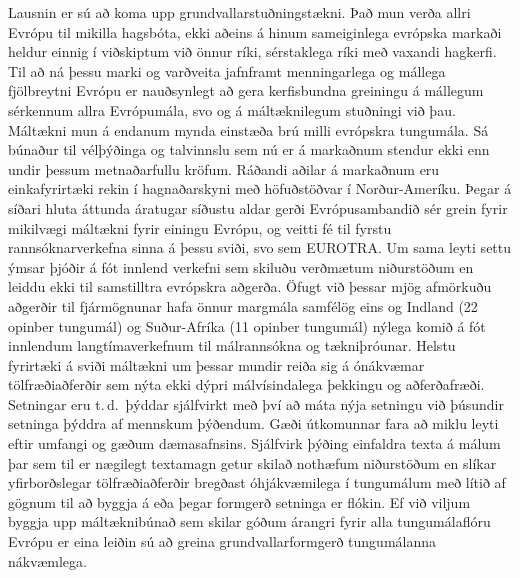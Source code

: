 \begin{multicols}{2}
Lausnin er sú að koma upp grundvallarstuðningstækni. Það mun verða allri Evrópu til mikilla hagsbóta, ekki aðeins á hinum sameiginlega evrópska markaði heldur einnig í viðskiptum við önnur ríki, sérstaklega ríki með vaxandi hagkerfi. Til að ná þessu marki og varðveita jafnframt menningarlega og mállega fjölbreytni Evrópu er nauðsynlegt að gera kerfisbundna greiningu á mállegum sérkennum allra Evrópumála, svo og á máltæknilegum stuðningi við þau. Máltækni mun á endanum mynda einstæða brú milli evrópskra tungumála.
Sá búnaður til vélþýðinga og talvinnslu sem nú er á markaðnum stendur ekki enn undir þessum metnaðarfullu kröfum.
Ráðandi aðilar á markaðnum eru einkafyrirtæki rekin í hagnaðarskyni með höfuðstöðvar í Norður-Ameríku. Þegar á síðari hluta áttunda áratugar síðustu aldar gerði Evrópusambandið sér grein fyrir mikilvægi máltækni fyrir einingu Evrópu, og veitti fé til fyrstu rannsóknarverkefna sinna á þessu sviði, svo sem EUROTRA. 
Um sama leyti settu ýmsar þjóðir á fót innlend verkefni sem skiluðu verðmætum niðurstöðum en leiddu ekki til samstilltra evrópskra aðgerða. Öfugt við þessar mjög afmörkuðu aðgerðir til fjármögnunar hafa önnur margmála samfélög eins og Indland (22 opinber tungumál) og Suður-Afríka (11 opinber tungumál) nýlega komið á fót innlendum langtímaverkefnum til málrannsókna og tækniþróunar.
Helstu fyrirtæki á sviði máltækni um þessar mundir reiða sig á ónákvæmar tölfræðiaðferðir sem nýta ekki dýpri málvísindalega þekkingu og aðferðafræði. Setningar eru t.\,d.~þýddar sjálfvirkt með því að máta nýja setningu við þúsundir setninga þýddra af mennskum þýðendum. Gæði útkomunnar fara að miklu leyti eftir umfangi og gæðum dæmasafnsins. Sjálfvirk þýðing einfaldra texta á málum þar sem til er nægilegt textamagn getur skilað nothæfum niðurstöðum en slíkar yfirborðslegar tölfræðiaðferðir bregðast óhjákvæmilega í tungumálum með lítið af gögnum til að byggja á eða þegar formgerð setninga er flókin. Ef við viljum byggja upp máltæknibúnað sem skilar góðum árangri fyrir alla tungumálaflóru Evrópu er eina leiðin sú að greina grundvallarformgerð tungumálanna nákvæmlega.


\end{multicols}
